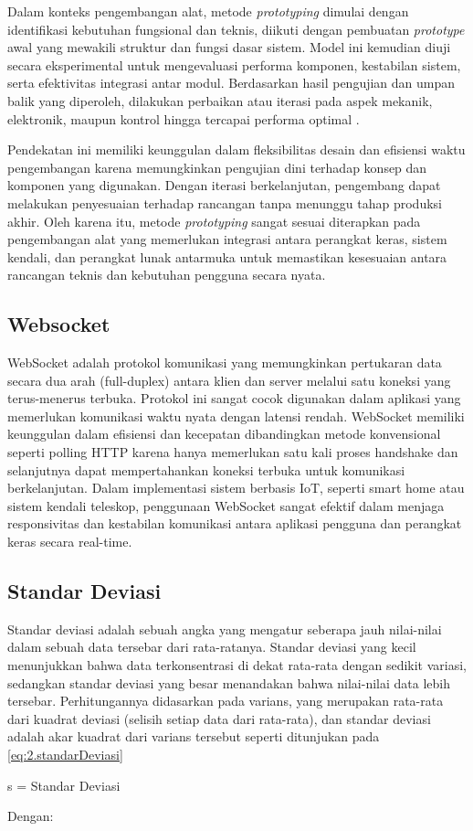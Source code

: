 Dalam konteks pengembangan alat, metode \textit{prototyping} dimulai dengan identifikasi kebutuhan fungsional dan teknis, diikuti dengan pembuatan \textit{prototype} awal yang mewakili struktur dan fungsi dasar sistem. Model ini kemudian diuji secara eksperimental untuk mengevaluasi performa komponen, kestabilan sistem, serta efektivitas integrasi antar modul. Berdasarkan hasil pengujian dan umpan balik yang diperoleh, dilakukan perbaikan atau iterasi pada aspek mekanik, elektronik, maupun kontrol hingga tercapai performa optimal \cite{tetteh2024agile}.

Pendekatan ini memiliki keunggulan dalam fleksibilitas desain dan efisiensi waktu pengembangan karena memungkinkan pengujian dini terhadap konsep dan komponen yang digunakan. Dengan iterasi berkelanjutan, pengembang dapat melakukan penyesuaian terhadap rancangan tanpa menunggu tahap produksi akhir. Oleh karena itu, metode \textit{prototyping} sangat sesuai diterapkan pada pengembangan alat yang memerlukan integrasi antara perangkat keras, sistem kendali, dan perangkat lunak antarmuka untuk memastikan kesesuaian antara rancangan teknis dan kebutuhan pengguna secara nyata.


\subsection{Websocket} \label{II.Teori6}
WebSocket adalah protokol komunikasi yang memungkinkan pertukaran data secara dua arah (full-duplex) antara klien dan server melalui satu koneksi yang terus-menerus terbuka. Protokol ini sangat cocok digunakan dalam aplikasi yang memerlukan komunikasi waktu nyata dengan latensi rendah. WebSocket memiliki keunggulan dalam efisiensi dan kecepatan dibandingkan metode konvensional seperti polling HTTP karena hanya memerlukan satu kali proses handshake dan selanjutnya dapat mempertahankan koneksi terbuka untuk komunikasi berkelanjutan\cite{Soewito2019}. Dalam implementasi sistem berbasis IoT, seperti smart home atau sistem kendali teleskop, penggunaan WebSocket sangat efektif dalam menjaga responsivitas dan kestabilan komunikasi antara aplikasi pengguna dan perangkat keras secara real-time. \par

\subsection{Standar Deviasi} \label{II.Teori7}
Standar deviasi adalah sebuah angka yang mengatur seberapa jauh nilai-nilai dalam sebuah data tersebar dari rata-ratanya. Standar deviasi yang kecil menunjukkan bahwa data terkonsentrasi di dekat rata-rata dengan sedikit variasi, sedangkan standar deviasi yang besar menandakan bahwa nilai-nilai data lebih tersebar. Perhitungannya didasarkan pada varians, yang merupakan rata-rata dari kuadrat deviasi (selisih setiap data dari rata-rata), dan standar deviasi adalah akar kuadrat dari varians tersebut seperti ditunjukan pada \ref{eq:2.standarDeviasi}
\begin{equationcaptioned}[eq:2.standarDeviasi]{
		s = 
	}{
		Standar Deviasi
	}
\end{equationcaptioned}
Dengan:

